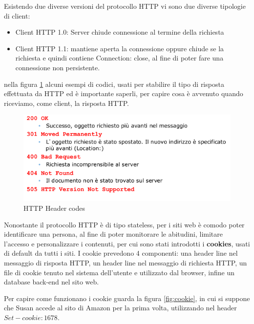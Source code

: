 \documentclass[a4paper,12pt, oneside]{book}
\begin{document}
Esistendo due diverse versioni del protocollo HTTP vi sono due diverse tipologie di client:
\begin{itemize}
	\item Client HTTP 1.0: Server chiude connessione al termine della richiesta
	\item Client HTTP 1.1: mantiene aperta la connessione oppure chiude se la richiesta e quindi
	      contiene Connection: close, al fine di poter fare una connessione non persistente.
\end{itemize}
nella figura \ref{http:headerCode} alcuni esempi di codici, usati per stabilire il tipo di risposta 
effettuata da HTTP ed è importante saperli, per capire cosa è avvenuto quando riceviamo, come client,
la risposta HTTP.

\begin{figure}
    \caption{HTTP Header codes}
    \label{http:headerCode}
	\includegraphics[scale=0.7]{img/http3.png}
\end{figure}
Nonostante il protocollo HTTP è di tipo stateless, per i siti web è comodo poter identificare una persona,
al fine di poter monitorare le abitudini, limitare l'accesso e personalizzare i contenuti, per cui sono 
stati introdotti i \textbf{cookies}, usati di default da tutti i siti.\newline
I cookie prevedono 4 componenti: una header line nel messaggio di risposta HTTP, un header line nel
messaggio di richiesta HTTP, un file di cookie tenuto nel sistema dell'utente e utilizzato dal browser,
infine un database back-end nel sito web.

Per capire come funzionano i cookie guarda la figura \ref{fig:cookie}, in cui si suppone che 
Susan accede al sito di Amazon per la prima volta, utilizzando nel header $Set-cookie: 1678$.
\end{document}
